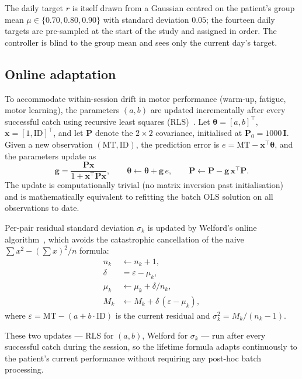 \documentclass[11pt,a4paper]{article}
\begin{document}
The daily target $r$ is itself drawn from a Gaussian centred on the patient's group mean $\mu \in \{0.70, 0.80, 0.90\}$ with standard deviation $0.05$; the fourteen daily targets are pre-sampled at the start of the study and assigned in order. The controller is blind to the group mean and sees only the current day's target.

\subsection{Online adaptation}

To accommodate within-session drift in motor performance (warm-up, fatigue, motor learning), the parameters $(a, b)$ are updated incrementally after every successful catch using recursive least squares (RLS)~\cite{ljung1999}. Let $\boldsymbol{\theta} = [a, b]^\top$, $\mathbf{x} = [1, \text{ID}]^\top$, and let $\mathbf{P}$ denote the $2 \times 2$ covariance, initialised at $\mathbf{P}_0 = 1000\,\mathbf{I}$. Given a new observation $(\text{MT}, \text{ID})$, the prediction error is $e = \text{MT} - \mathbf{x}^\top \boldsymbol{\theta}$, and the parameters update as
\begin{equation}
    \mathbf{g} = \frac{\mathbf{P}\mathbf{x}}{1 + \mathbf{x}^\top \mathbf{P} \mathbf{x}}, \qquad
    \boldsymbol{\theta} \leftarrow \boldsymbol{\theta} + \mathbf{g}\,e, \qquad
    \mathbf{P} \leftarrow \mathbf{P} - \mathbf{g}\,\mathbf{x}^\top \mathbf{P}.
\end{equation}
The update is computationally trivial (no matrix inversion past initialisation) and is mathematically equivalent to refitting the batch OLS solution on all observations to date.

Per-pair residual standard deviation $\sigma_k$ is updated by Welford's online algorithm~\cite{welford1962}, which avoids the catastrophic cancellation of the naive $\sum x^2 - (\sum x)^2 / n$ formula:
\begin{align}
    n_k &\leftarrow n_k + 1, \\
    \delta &= \varepsilon - \mu_k, \\
    \mu_k &\leftarrow \mu_k + \delta / n_k, \\
    M_k &\leftarrow M_k + \delta \,(\varepsilon - \mu_k),
\end{align}
where $\varepsilon = \text{MT} - (a + b \cdot \text{ID})$ is the current residual and $\sigma_k^2 = M_k / (n_k - 1)$.

These two updates --- RLS for $(a, b)$, Welford for $\sigma_k$ --- run after every successful catch during the session, so the lifetime formula adapts continuously to the patient's current performance without requiring any post-hoc batch processing.
\end{document}
